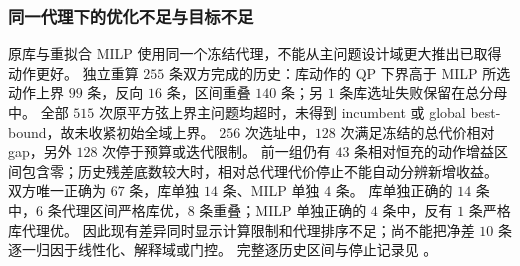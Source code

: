 \subsubsection{同一代理下的优化不足与目标不足}
原库与重拟合 MILP 使用同一个冻结代理，不能从主问题设计域更大推出已取得动作更好。
独立重算 $255$ 条双方完成的历史：库动作的 QP 下界高于 MILP 所选动作上界 $99$ 条，反向 $16$ 条，区间重叠 $140$ 条；另 $1$ 条库选址失败保留在总分母中。
全部 $515$ 次原平方弦上界主问题均超时，未得到 incumbent 或 global best-bound，故未收紧初始全域上界。
$256$ 次选址中，$128$ 次满足冻结的总代价相对 gap，另外 $128$ 次停于预算或迭代限制。
前一组仍有 $43$ 条相对恒充的动作增益区间包含零；历史残差底数较大时，相对总代理代价停止不能自动分辨新增收益。
双方唯一正确为 $67$ 条，库单独 $14$ 条、MILP 单独 $4$ 条。
库单独正确的 $14$ 条中，$6$ 条代理区间严格库优，$8$ 条重叠；MILP 单独正确的 $4$ 条中，反有 $1$ 条严格库代理优。
因此现有差异同时显示计算限制和代理排序不足；尚不能把净差 $10$ 条逐一归因于线性化、解释域或门控。
完整逐历史区间与停止记录见 。
